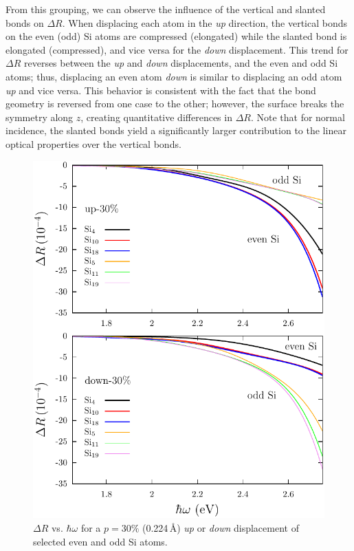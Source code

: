 \documentclass[pss]{wiley2sp} %
\begin{document}
From this grouping, we can observe the influence of the vertical and slanted
bonds on $\Delta R$. When displacing each atom in the \emph{up} direction, the
vertical bonds on the even (odd) Si atoms are compressed (elongated) while the
slanted bond is elongated (compressed), and vice versa for the \emph{down}
displacement. This trend for $\Delta R$ reverses between the \emph{up} and
\emph{down} displacements, and the even and odd Si atoms; thus, displacing an
even atom \emph{down} is similar to displacing an odd atom \emph{up} and vice
versa. This behavior is consistent with the fact that the bond geometry is
reversed from one case to the other; however, the surface breaks the symmetry
along $z$, creating quantitative differences in $\Delta R$. Note that for normal
incidence, the slanted bonds yield a significantly larger contribution to the
linear optical properties over the vertical bonds.

\begin{figure}[b]
\begin{center}
\includegraphics[width=0.9\linewidth]{fig02}
\caption{$\Delta R$ vs. $\hbar\omega$ for a $p = 30\%$ (0.224\,\AA) \emph{up} or
\emph{down} displacement of selected even and odd Si atoms.}
\label{fig:2}
\end{center}
\end{figure}
\end{document}
